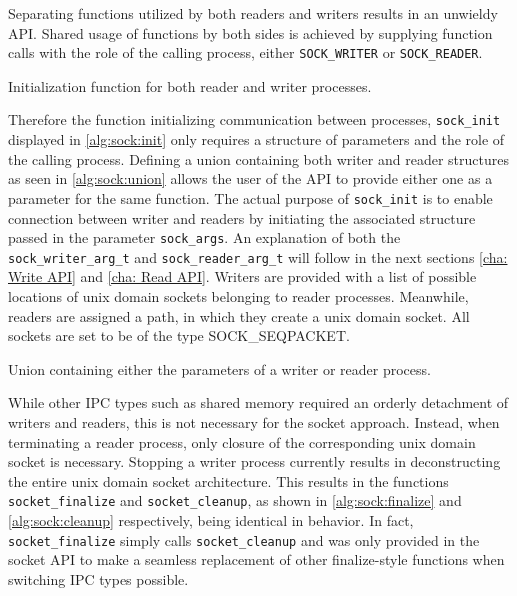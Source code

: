 Separating functions utilized by both readers and writers results in an unwieldy API.
Shared usage of functions by both sides is achieved by supplying function calls with the role of the calling process, either \texttt{SOCK\_WRITER} or \texttt{SOCK\_READER}.

\begin{algorithm}[h!]
    
    \caption[Socket: Socket initialization]{Initialization function for both reader and writer processes.}
    \label{alg:sock:init}
\end{algorithm}

Therefore the function initializing communication between processes, \texttt{sock\_init} displayed in \ref{alg:sock:init} only requires a structure of parameters and the role of the calling process.
Defining a union containing both writer and reader structures as seen in \ref{alg:sock:union} allows the user of the API to provide either one as a parameter for the same function.
The actual purpose of \texttt{sock\_init} is to enable connection between writer and readers by initiating the associated structure passed in the parameter \texttt{sock\_args}.
An explanation of both the \texttt{sock\_writer\_arg\_t} and \texttt{sock\_reader\_arg\_t} will follow in the next sections \ref{cha: Write API} and \ref{cha: Read API}.
Writers are provided with a list of possible locations of unix domain sockets belonging to reader processes.
Meanwhile, readers are assigned a path, in which they create a unix domain socket.
All sockets are set to be of the type SOCK\_SEQPACKET.

\begin{algorithm}[h!]
    
    \caption[Socket: Union for flexible function calling]{Union containing either the parameters of a writer or reader process.}
    \label{alg:sock:union}
\end{algorithm}

While other IPC types such as shared memory required an orderly detachment of writers and readers, this is not necessary for the socket approach.
Instead, when terminating a reader process, only closure of the corresponding unix domain socket is necessary.
Stopping a writer process currently results in deconstructing the entire unix domain socket architecture.
This results in the functions \texttt{socket\_finalize} and \texttt{socket\_cleanup}, as shown in \ref{alg:sock:finalize} and \ref{alg:sock:cleanup} respectively, being identical in behavior.
In fact, \texttt{socket\_finalize} simply calls \texttt{socket\_cleanup} and was only provided in the socket API to make a seamless replacement of other finalize-style functions when switching IPC types possible.


